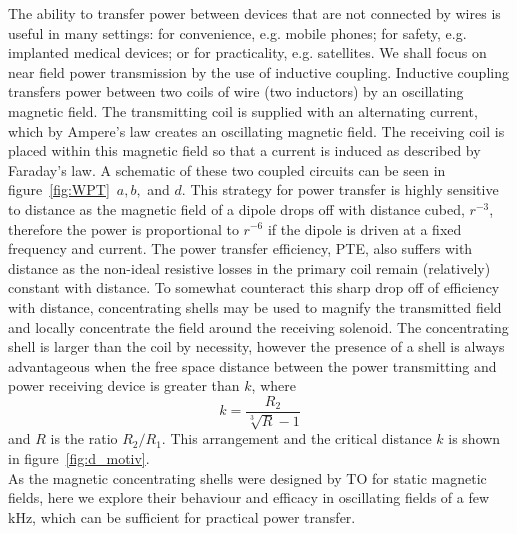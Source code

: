 \documentclass[11pt]{iopart}
\begin{document}
The ability to transfer power between devices that are not connected
by wires is useful in many settings: for convenience, e.g. mobile
phones; for safety, e.g. implanted medical devices; or for
practicality, e.g. satellites. We shall focus on near field power
transmission by the use of inductive coupling. Inductive coupling
transfers power between two coils of wire (two inductors) by an
oscillating magnetic field.  The transmitting coil is supplied with an
alternating current, which by Ampere's law creates an oscillating
magnetic field. The receiving coil is placed within this magnetic
field so that a current is induced as described by Faraday's law. A
schematic of these two coupled circuits can be seen in
figure~\ref{fig:WPT}~$a, b,$ and $d$. This strategy for power transfer
is highly sensitive to distance as the magnetic field of a dipole
drops off with distance cubed, $r^{-3}$, therefore the power is
proportional to $r^{-6}$ if the dipole is driven at a fixed frequency
and current.  The power transfer efficiency, PTE, also suffers with
distance as the non-ideal resistive losses in the primary coil remain
(relatively) constant with distance. To somewhat counteract this sharp
drop off of efficiency with distance, concentrating shells may be used
to magnify the transmitted field and locally concentrate the field
around the receiving solenoid. The concentrating shell is larger than
the coil by necessity, however the presence of a shell is always
advantageous when the free space distance between the power
transmitting and power receiving device is greater than $k$,\cite{Prat2016} where
\begin{equation}
k = \frac{R_2}{\sqrt[3]{R}-1}
\end{equation}
and $R$ is the ratio $R_2/R_1$. This arrangement and the critical
distance $k$ is shown in figure~\ref{fig:d_motiv}.\\
As the magnetic concentrating shells were designed by TO for static
magnetic fields, here we explore their behaviour and efficacy in
oscillating fields of a few kHz, which can be sufficient for practical
power transfer\cite{Wang2005}.\\



\end{document}
